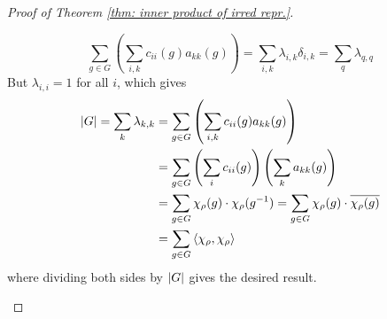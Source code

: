 \documentclass{article}
\begin{document}
\begin{proof}[Proof of Theorem \ref{thm: inner product of irred repr.}]
\begin{itemize}
        \[
            \sum_{g \in G} \left( \sum_{i, k} c_{ii}(g) a_{kk}(g) \right) = \sum_{i, k} \lambda_{i, k} \delta_{i, k} = \sum_{q} \lambda_{q, q}
        \]
        But $\lambda_{i, i} = 1$ for all $i$, which gives
        \begin{align*}
            \left|G\right| = \sum_{k} \lambda_{k, k}
            & = \sum_{g \in G} \left( \sum_{i, k} c_{ii}(g) a_{kk}(g) \right) \\
            & = \sum_{g \in G} \left( \sum_{i} c_{ii}(g) \right) \left( \sum_k a_{kk}(g) \right) \\
            & = \sum_{g \in G} \chi_{\rho}(g) \cdot \chi_{\rho}(g^{-1}) = \sum_{g \in G} \chi_{\rho}(g) \cdot \overline{\chi_{\rho}(g)} \\
            & = \sum_{g \in G} \left\langle \chi_{\rho}, \chi_{\rho} \right\rangle
        \end{align*}
        where dividing both sides by $\left|G\right|$ gives the desired result.
    \end{itemize}
\end{proof}
\end{document}
